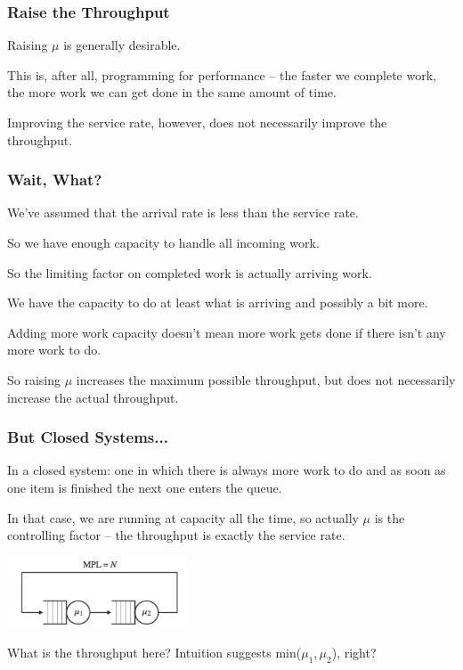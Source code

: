 \begin{frame}
\frametitle{Raise the Throughput}

Raising $\mu$ is generally desirable. 

This is, after all, programming for performance -- the faster we complete work, the more work we can get done in the same amount of time. 

Improving the service rate, however, does not necessarily improve the throughput. 

\end{frame}



\begin{frame}
\frametitle{Wait, What?}

We've assumed that the arrival rate is less than the service rate. 

So we have enough capacity to handle all incoming work. 

So the limiting factor on completed work is actually arriving work. 

We have the capacity to do at least what is arriving and possibly a bit more. 

Adding more work capacity doesn't mean more work gets done if there isn't any more work to do.

So raising $\mu$ increases the maximum possible throughput, but does not necessarily increase the actual throughput.

\end{frame}



\begin{frame}
\frametitle{But Closed Systems...}


In a closed system: one in which there is always more work to do and as soon as one item is finished the next one enters the queue. 

 In that case, we are running at capacity all the time, so actually $\mu$ is the controlling factor -- the throughput is exactly the service rate. 
 
 \begin{center}
	\includegraphics[width=0.4\textwidth]{images/tandem-closed.png}
\end{center}

What is the throughput here?  Intuition suggests min($\mu_{1}, \mu_{2}$), right? 

\end{frame}



